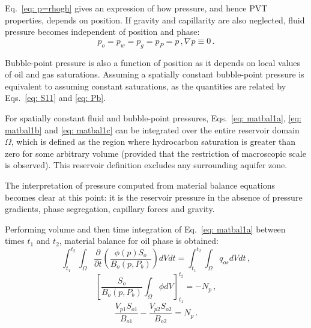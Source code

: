\documentclass[authoryear,preprint,review,12pt]{elsarticle}
\begin{document}
Eq.~\eqref{eq: p=rhogh} gives an expression of how pressure, and hence PVT properties, depends on position. If gravity and capillarity are also neglected, fluid pressure becomes independent of position and phase:
\begin{subequations}\label{eq: fullsimp}
\begin{equation}
p_o=p_w=p_g=p_P=p \, ,
\end{equation}
\begin{equation}
\nabla p \equiv 0 \, .
\end{equation}
\end{subequations}

Bubble-point pressure is also a function of position as it depends on local values of oil and gas saturations. Assuming a spatially constant bubble-point pressure is equivalent to assuming constant saturations, as the quantities are related by Eqs.~\eqref{eq: S11} and \eqref{eq: Pb}.


For spatially constant fluid and bubble-point pressures, Eqs.~\eqref{eq: matbal1a}, \eqref{eq: matbal1b} and \eqref{eq: matbal1c} can be integrated over the entire reservoir domain $\Omega$, which is defined as the region where hydrocarbon saturation is greater than zero for some arbitrary volume (provided that the restriction of macroscopic scale is observed). This reservoir definition excludes any surrounding aquifer zone.

The interpretation of pressure computed from material balance equations becomes clear at this point: it is the reservoir pressure in the absence of pressure gradients, phase segregation, capillary forces and gravity.

Performing volume and then time integration of Eq.~\eqref{eq: matbal1a} between times $t_1$ and $t_2$, material balance for oil phase is obtained:
\begin{equation}
\int_{t_1}^{t_2}\int_{\Omega} \frac{\partial}{\partial t}\left(\frac{\phi(p) S_o}{B_o(p,P_b)}\right) dV dt = \int_{t_1}^{t_2}\int_{\Omega} q_{os} dV dt\, ,
\end{equation}
\begin{equation}
\left[ \frac{S_o}{B_o(p,P_b)} \int_{\Omega}\phi dV \right]^{t_2}_{t_1} = -N_p \, ,
\end{equation}
\begin{equation}\label{eq: So5}
\frac{V_{p1} S_{o1}}{B_{o1}}-\frac{V_{p2}S_{o2}}{B_{o2}} = N_p \, .
\end{equation}
\end{document}
